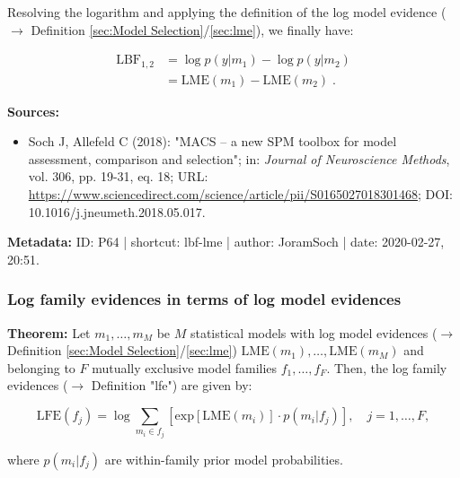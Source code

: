 \documentclass[a4paper,12pt]{book}
\begin{document}
Resolving the logarithm and applying the definition of the log model evidence ($\rightarrow$ Definition \ref{sec:Model Selection}/\ref{sec:lme}), we finally have:

\begin{equation} \label{eq:lbf-lme-LBF-s4}
\begin{split}
\mathrm{LBF}_{1,2} &= \log p(y|m_1) - \log p(y|m_2) \\
&= \mathrm{LME}(m_1) - \mathrm{LME}(m_2) \; .
\end{split}
\end{equation}

\vspace{1em}
\textbf{Sources:}
\begin{itemize}
\item Soch J, Allefeld C (2018): "MACS – a new SPM toolbox for model assessment, comparison and selection"; in: \textit{Journal of Neuroscience Methods}, vol. 306, pp. 19-31, eq. 18; URL: \url{https://www.sciencedirect.com/science/article/pii/S0165027018301468}; DOI: 10.1016/j.jneumeth.2018.05.017.
\end{itemize}


\vspace{1em}
\textbf{Metadata:} ID: P64 | shortcut: lbf-lme | author: JoramSoch | date: 2020-02-27, 20:51.


\subsubsection[\textbf{Log family evidences in terms of log model evidences}]{Log family evidences in terms of log model evidences} \label{sec:lfe-lme}

\vspace{1em}
\textbf{Theorem:} Let $m_1, \ldots, m_M$ be $M$ statistical models with log model evidences ($\rightarrow$ Definition \ref{sec:Model Selection}/\ref{sec:lme}) $\mathrm{LME}(m_1), \ldots, \mathrm{LME}(m_M)$ and belonging to $F$ mutually exclusive model families $f_1, \ldots, f_F$. Then, the log family evidences ($\rightarrow$ Definition "lfe") are given by:

\begin{equation} \label{eq:lfe-lme-LFE-LME}
\mathrm{LFE}(f_j) = \log \sum_{m_i \in f_j} \left[ \mathrm{exp}[\mathrm{LME}(m_i)] \cdot p(m_i|f_j) \right], \quad j = 1, \ldots, F,
\end{equation}

where $p(m_i \vert f_j)$ are within-family prior model probabilities.
\end{document}
